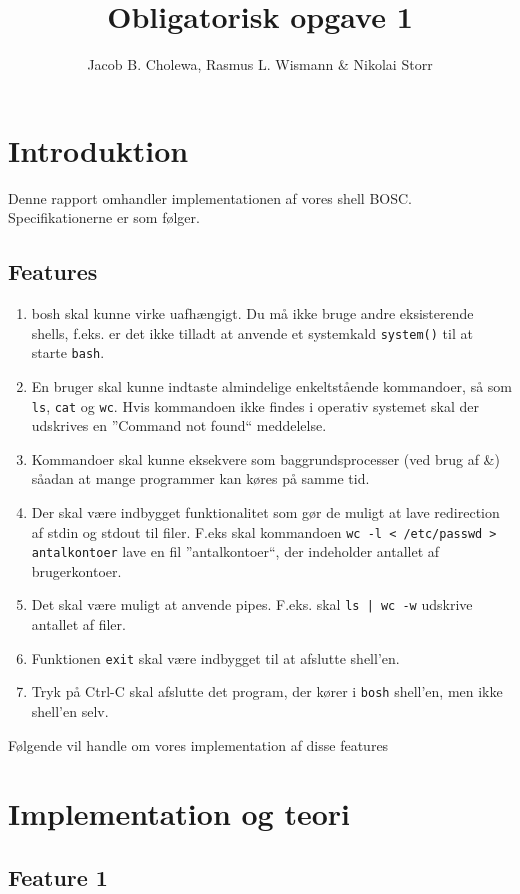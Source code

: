 \documentclass[danish]{report}
\title{Obligatorisk opgave 1}
\author{Jacob B. Cholewa, Rasmus L. Wismann \& Nikolai Storr }
\begin{document}
\maketitle
\newpage
\tableofcontents
\newpage

\chapter{Introduktion}
Denne rapport omhandler implementationen af vores shell BOSC. Specifikationerne er som følger.


\section{Features}
\begin{enumerate}
\item bosh skal kunne virke uafhængigt. Du må ikke bruge andre eksisterende shells, f.eks. er det ikke tilladt at anvende et systemkald {\tt system()} til at starte {\tt bash}.
\item En bruger skal kunne indtaste almindelige enkeltstående kommandoer, så som {\tt ls}, {\tt cat} og {\tt wc}. Hvis kommandoen ikke findes i operativ systemet skal der udskrives en ”Command not found“ meddelelse.
\item Kommandoer skal kunne eksekvere som baggrundsprocesser (ved brug af \&) såadan at mange programmer kan køres på samme tid.
\item Der skal være indbygget funktionalitet som gør de muligt at lave redirection af stdin og stdout til filer. F.eks skal kommandoen {\tt wc -l < /etc/passwd > antalkontoer} lave en fil ”antalkontoer“, der indeholder antallet af brugerkontoer.
\item Det skal være muligt at anvende pipes. F.eks. skal {\tt ls | wc -w} udskrive antallet af filer.
\item Funktionen {\tt exit} skal være indbygget til at afslutte shell’en.
\item Tryk på Ctrl-C skal afslutte det program, der kører i {\tt bosh} shell’en, men ikke shell’en selv.
\end{enumerate}

Følgende vil handle om vores implementation af disse features 


\chapter{Implementation og teori}
\section{Feature 1}
\end{document}
